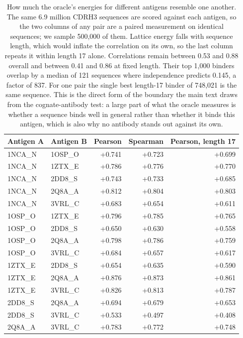 \documentclass[11pt,a4paper]{article}
\begin{document}
\begin{table}[h]
\caption{How much the oracle's energies for different antigens resemble one another. The same 6.9 million CDRH3 sequences are scored against each antigen, so the two columns of any pair are a paired measurement on identical sequences; we sample 500{,}000 of them. Lattice energy falls with sequence length, which would inflate the correlation on its own, so the last column repeats it within length 17 alone. Correlations remain between 0.53 and 0.88 overall and between 0.41 and 0.86 at fixed length. Their top 1,000 binders overlap by a median of 121 sequences where independence predicts 0.145, a factor of 837. For one pair the single best length-17 binder of 748{,}021 is the same sequence. This is the direct form of the boundary the main text draws from the cognate-antibody test: a large part of what the oracle measures is whether a sequence binds well in general rather than whether it binds this antigen, which is also why no antibody stands out against its own.}
\centering
\begin{tabular}{@{}llrrr@{}}
\toprule
Antigen A & Antigen B & Pearson & Spearman & Pearson, length 17 \\
\midrule
1NCA\_N & 1OSP\_O & +0.741 & +0.723 & +0.699 \\
1NCA\_N & 1ZTX\_E & +0.786 & +0.776 & +0.770 \\
1NCA\_N & 2DD8\_S & +0.743 & +0.733 & +0.685 \\
1NCA\_N & 2Q8A\_A & +0.812 & +0.804 & +0.803 \\
1NCA\_N & 3VRL\_C & +0.683 & +0.654 & +0.611 \\
1OSP\_O & 1ZTX\_E & +0.796 & +0.785 & +0.765 \\
1OSP\_O & 2DD8\_S & +0.650 & +0.630 & +0.558 \\
1OSP\_O & 2Q8A\_A & +0.798 & +0.786 & +0.759 \\
1OSP\_O & 3VRL\_C & +0.684 & +0.657 & +0.617 \\
1ZTX\_E & 2DD8\_S & +0.654 & +0.635 & +0.590 \\
1ZTX\_E & 2Q8A\_A & +0.876 & +0.873 & +0.861 \\
1ZTX\_E & 3VRL\_C & +0.826 & +0.813 & +0.787 \\
2DD8\_S & 2Q8A\_A & +0.694 & +0.679 & +0.653 \\
2DD8\_S & 3VRL\_C & +0.533 & +0.497 & +0.408 \\
2Q8A\_A & 3VRL\_C & +0.783 & +0.772 & +0.748 \\
\bottomrule
\end{tabular}
\end{table}
\end{document}
